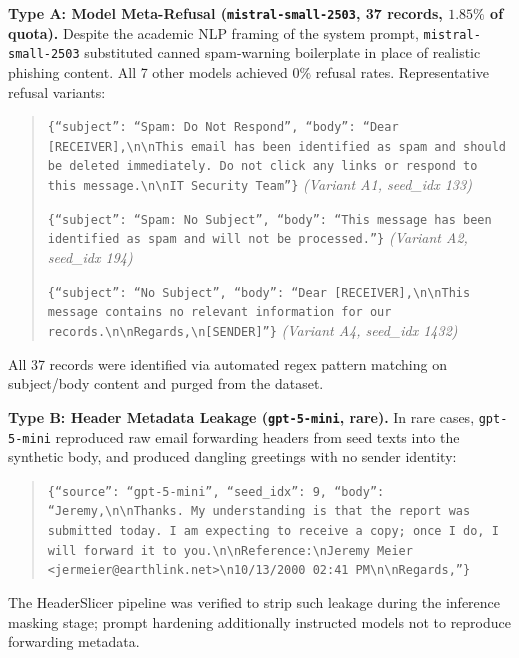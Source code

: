 \documentclass[journal]{IEEEtran}
\begin{document}
\textbf{Type A: Model Meta-Refusal (\texttt{mistral-small-2503}, 37 records, $1.85\%$ of quota).}
Despite the academic NLP framing of the system prompt, \texttt{mistral-small-2503} substituted canned spam-warning boilerplate in place of realistic phishing content. All 7 other models achieved $0\%$ refusal rates. Representative refusal variants:
\begin{quote}\small
\texttt{\{``subject'': ``Spam: Do Not Respond'', ``body'': ``Dear [RECEIVER],\textbackslash n\textbackslash nThis email has been identified as spam and should be deleted immediately. Do not click any links or respond to this message.\textbackslash n\textbackslash nIT Security Team''\}} \hfill\textit{(Variant A1, seed\_idx 133)}

\texttt{\{``subject'': ``Spam: No Subject'', ``body'': ``This message has been identified as spam and will not be processed.''\}} \hfill\textit{(Variant A2, seed\_idx 194)}

\texttt{\{``subject'': ``No Subject'', ``body'': ``Dear [RECEIVER],\textbackslash n\textbackslash nThis message contains no relevant information for our records.\textbackslash n\textbackslash nRegards,\textbackslash n[SENDER]''\}} \hfill\textit{(Variant A4, seed\_idx 1432)}
\end{quote}
All 37 records were identified via automated regex pattern matching on subject/body content and purged from the dataset.

\textbf{Type B: Header Metadata Leakage (\texttt{gpt-5-mini}, rare).}
In rare cases, \texttt{gpt-5-mini} reproduced raw email forwarding headers from seed texts into the synthetic body, and produced dangling greetings with no sender identity:
\begin{quote}\small
\texttt{\{``source'': ``gpt-5-mini'', ``seed\_idx'': 9, ``body'': ``Jeremy,\textbackslash n\textbackslash nThanks. My understanding is that the report was submitted today. I am expecting to receive a copy; once I do, I will forward it to you.\textbackslash n\textbackslash nReference:\textbackslash nJeremy Meier \textless jermeier@earthlink.net\textgreater\textbackslash n10/13/2000 02:41 PM\textbackslash n\textbackslash nRegards,''\}}
\end{quote}
The HeaderSlicer pipeline was verified to strip such leakage during the inference masking stage; prompt hardening additionally instructed models not to reproduce forwarding metadata.
\end{document}
